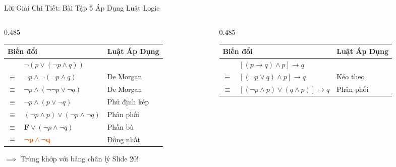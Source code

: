 \documentclass[aspectratio=169, 10pt]{beamer}
\begin{document}
\begin{frame}{Lời Giải Chi Tiết: Bài Tập 5 Áp Dụng Luật Logic}
  \begin{columns}[t, onlytextwidth]
    \begin{column}{0.485\textwidth}
      \begin{cozyExample}
        \scriptsize
        \renewcommand{\arraystretch}{1.0}
        \setlength{\tabcolsep}{1.2pt}
        \begin{tabular}{cll}
          \toprule
          \multicolumn{2}{l}{\textbf{Biến đổi}} & \textbf{Luật Áp Dụng} \\
          \midrule
          & $\neg(p \lor (\neg p \land q))$ \\
          $\equiv$ & $\neg p \land \neg(\neg p \land q)$ & De Morgan \\
          $\equiv$ & $\neg p \land (\neg\neg p \lor \neg q)$ & De Morgan \\
          $\equiv$ & $\neg p \land (p \lor \neg q)$ & Phủ định kép \\
          $\equiv$ & $(\neg p \land p) \lor (\neg p \land \neg q)$ & Phân phối \\
          $\equiv$ & $\mathbf{F} \lor (\neg p \land \neg q)$ & Phần bù \\
          $\equiv$ & $\mathbf{\textcolor{cozyWarm}{\neg p \land \neg q}}$ & Đồng nhất \\
          \bottomrule
        \end{tabular}
        \vspace{0.03cm}
        \par\centering\tiny\color{cozyTrue}$\implies$ Trùng khớp với bảng chân lý Slide 20!
      \end{cozyExample}
    \end{column}
    \begin{column}{0.485\textwidth}
      \begin{cozyExample}
        \scriptsize
        \renewcommand{\arraystretch}{1.0}
        \setlength{\tabcolsep}{1.2pt}
        \begin{tabular}{cll}
          \toprule
          \multicolumn{2}{l}{\textbf{Biến đổi}} & \textbf{Luật Áp Dụng} \\
          \midrule
          & $[(p \to q) \land p] \to q$ \\
          $\equiv$ & $[(\neg p \lor q) \land p] \to q$ & Kéo theo \\
          $\equiv$ & $[(\neg p \land p) \lor (q \land p)] \to q$ & Phân phối \\

\end{tabular}
\end{cozyExample}
\end{column}
\end{columns}
\end{frame}
\end{document}
